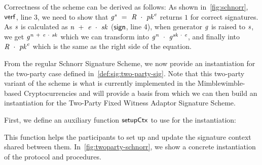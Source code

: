 Correctness of the scheme can be derived as follows:
As shown in~\cref{fig:schnorr}, $\mathsf{verf}$, line 3, we need to show that $\mathit{g}^{\mathit{s}} ~=~ \mathit{R} ~\cdot~ \mathit{pk}^{\mathit{e}}$ returns $1$ for correct signatures.
As $\mathit{s}$ is calculated as $\mathit{n} ~+~ \mathit{e} ~\cdot~ \mathit{sk}$ ($\mathsf{sign}$, line 4), when generator $\mathit{g}$ is raised to $\mathit{s}$, we get $\mathit{g}^{\mathit{n} ~+~ \mathit{e} ~\cdot~ \mathit{sk}}$ which we can transform into $\mathit{g}^{\mathit{n}} ~\cdot~ \mathit{g}^{\mathit{sk} ~\cdot~ \mathit{e}}$, and finally into $\mathit{R} ~\cdot~ \mathit{pk}^{\mathit{e}}$ which is the same as the right side of the equation.

From the regular Schnorr Signature Scheme, we now provide an instantiation for the two-party case defined in~\cref{def:sig:two-party-sig}.
Note that this two-party variant of the scheme is what is currently implemented in the Mimblewimble-based Cryptocurrencies and will provide a basis from which we can then build an instantiation for the Two-Party Fixed Witness Adaptor Signature Scheme.

First, we define an auxiliary function $\mathsf{setupCtx}$ to use for the instantiation:

\begin{center}
    \fbox{
    \begin{varwidth}{\textwidth}
        \procedure[linenumbering]{$\procSetupCtx{\varSigContext}{\varPubKeyAlice}{\varRandAlice}$} {
        \opAccess{\varSigContext}{\varPubKey} \opAssign \opAccess{\varSigContext}{\varPubKey} \opAddPoint \varPubKeyAlice \\
        \opAccess{\varSigContext}{\varRand} \opAssign \opAccess{\varSigContext}{\varRand} \opAddPoint \varRandAlice \\
        \pcreturn \varSigContext
        } \\
    \end{varwidth}
    }
\end{center}

This function helps the participants to set up and update the signature context shared between them.
In~\cref{fig:twoparty-schnorr}, we show a concrete instantiation of the protocol and procedures.

